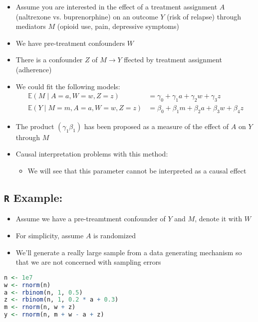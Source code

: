 \documentclass[
  12pt,
]{book}
\providecommand{\tightlist}{%
  \setlength{\itemsep}{0pt}\setlength{\parskip}{0pt}}
\theoremstyle{definition}
\theoremstyle{definition}
\theoremstyle{definition}
\newcommand{\E}{\mathbb{E}}
\newcommand{\1}{\mathbbm{1}}
\begin{document}
\begin{itemize}
\tightlist
\item
  Assume you are interested in the effect of a treatment assignment \(A\) (naltrexone vs.
  buprenorphine) on an outcome \(Y\) (risk of relapse) through mediators \(M\)
  (opioid use, pain, depressive symptoms)
\item
  We have pre-treatment confounders \(W\)
\item
  There is a confounder \(Z\) of \(M\rightarrow Y\) ffected by treatment assignment (adherence)
\item
  We could fit the following models:
  \begin{align}
      \E(M\mid A=a, W=w, Z=z) & = \gamma_0 + \gamma_1 a + \gamma_2 w + \gamma_3 z \\
      \E(Y\mid M=m, A=a, W=w, Z=z) & = \beta_0 + \beta_1 m + \beta_2 a + \beta_3 w + \beta_4 z
    \end{align}
\item
  The product \((\gamma_1\beta_1)\) has been proposed as a measure of the effect
  of \(A\) on \(Y\) through \(M\)
\item
  Causal interpretation problems with this method:

  \begin{itemize}
  \tightlist
  \item
    We will see that this parameter cannot be interpreted as a causal effect
  \end{itemize}
\end{itemize}

\hypertarget{r-example}{%
\subsection{\texorpdfstring{\texttt{R} Example:}{R Example:}}\label{r-example}}

\begin{itemize}
\tightlist
\item
  Assume we have a pre-treamtment confounder of \(Y\) and \(M\), denote it with \(W\)
\item
  For simplicity, assume \(A\) is randomized
\item
  We'll generate a really large sample from a data generating mechanism so that
  we are not concerned with sampling errors
\end{itemize}

\begin{lstlisting}[language=R]
n <- 1e7
w <- rnorm(n)
a <- rbinom(n, 1, 0.5)
z <- rbinom(n, 1, 0.2 * a + 0.3)
m <- rnorm(n, w + z)
y <- rnorm(n, m + w - a + z)
\end{lstlisting}
\end{document}
